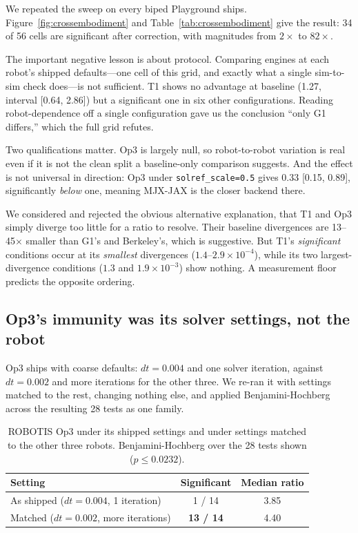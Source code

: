 \documentclass[conference]{IEEEtran}
\newcommand{\tabfont}{\footnotesize}
\begin{document}
We repeated the sweep on every biped Playground ships.
Figure~\ref{fig:crossembodiment} and Table~\ref{tab:crossembodiment} give
the result: 34 of 56 cells are significant after correction, with
magnitudes from $2\times$ to $82\times$.

The important negative lesson is about protocol. Comparing engines at
each robot's shipped defaults---one cell of this grid, and exactly what a
single sim-to-sim check does---is not sufficient. T1 shows no advantage
at baseline (1.27, interval [0.64, 2.86]) but a significant one in six
other configurations. Reading robot-dependence off a single configuration
gave us the conclusion ``only G1 differs,'' which the full grid refutes.

Two qualifications matter. Op3 is largely null, so robot-to-robot
variation is real even if it is not the clean split a baseline-only
comparison suggests. And the effect is not universal in direction: Op3
under \texttt{solref\_scale=0.5} gives 0.33 [0.15, 0.89], significantly
\emph{below} one, meaning MJX-JAX is the closer backend there.

We considered and rejected the obvious alternative explanation, that T1
and Op3 simply diverge too little for a ratio to resolve. Their baseline
divergences are 13--45$\times$ smaller than G1's and Berkeley's, which is
suggestive. But T1's \emph{significant} conditions occur at its
\emph{smallest} divergences ($1.4$--$2.9\times10^{-4}$), while its two
largest-divergence conditions ($1.3$ and $1.9\times10^{-3}$) show nothing.
A measurement floor predicts the opposite ordering.

\subsection{Op3's immunity was its solver settings, not the robot}

Op3 ships with coarse defaults: $dt=0.004$ and one solver iteration,
against $dt=0.002$ and more iterations for the other three. We re-ran it
with settings matched to the rest, changing nothing else, and applied
Benjamini-Hochberg across the resulting 28 tests as one family.

\begin{table}[t]
\caption{ROBOTIS Op3 under its shipped settings and under settings
matched to the other three robots. Benjamini-Hochberg over the 28 tests
shown ($p \le 0.0232$).}
\label{tab:op3}
\centering
\tabfont
\begin{tabular}{@{}lcc@{}}
\toprule
\textbf{Setting} & \textbf{Significant} & \textbf{Median ratio} \\
\midrule
As shipped ($dt=0.004$, 1 iteration) & 1 / 14 & 3.85 \\
Matched ($dt=0.002$, more iterations) & \textbf{13 / 14} & 4.40 \\
\bottomrule
\end{tabular}
\end{table}
\end{document}
